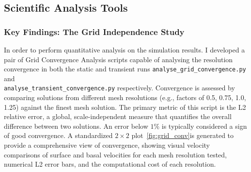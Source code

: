 \subsection{Scientific Analysis Tools}

\subsubsection{Key Findings: The Grid Independence Study}\label{grid_ind}
In order to  perform quantitative analysis on the simulation results. I developed a pair of Grid Convergence Analysis scripts capable of analysing the resolution convergence in both the static and transient runs \texttt{analyse\_grid\_convergence.py} and \\\texttt{analyse\_transient\_convergence.py} respectively. Convergence is assessed by comparing solutions from different mesh resolutions (e.g., factors of 0.5, 0.75, 1.0, 1.25) against the finest mesh solution. The primary metric of this script is the L2 relative error, a global, scale-independent measure that quantifies the overall difference between two solutions. An error below $1\%$ is typically considered a sign of good convergence. A standardized $2\times2$ plot~\ref{fig:grid_conv}is generated to provide a comprehensive view of convergence, showing visual velocity comparisons of surface and basal velocities for each mesh resolution tested, numerical L2 error bars, and the computational cost of each resolution.





